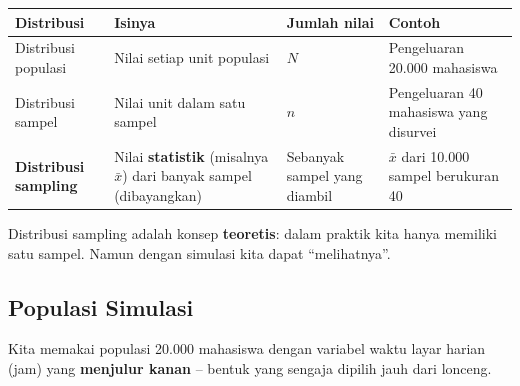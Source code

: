 \documentclass[
  indonesian,
  letterpaper,
]{book}
\newcounter{none} %
\begin{document}
{\def\LTcaptype{none} %
\begin{longtable}[]{@{}
  >{\raggedright\arraybackslash}p{}
  >{\raggedright\arraybackslash}p{}
  >{\raggedright\arraybackslash}p{}
  >{\raggedright\arraybackslash}p{}@{}}
\toprule\noalign{}
\begin{minipage}[b]{\linewidth}\raggedright
Distribusi
\end{minipage} & \begin{minipage}[b]{\linewidth}\raggedright
Isinya
\end{minipage} & \begin{minipage}[b]{\linewidth}\raggedright
Jumlah nilai
\end{minipage} & \begin{minipage}[b]{\linewidth}\raggedright
Contoh
\end{minipage} \\
\midrule\noalign{}
\endhead
\bottomrule\noalign{}
\endlastfoot
Distribusi populasi & Nilai setiap unit populasi & \(N\) & Pengeluaran
20.000 mahasiswa \\
Distribusi sampel & Nilai unit dalam satu sampel & \(n\) & Pengeluaran
40 mahasiswa yang disurvei \\
\textbf{Distribusi sampling} & Nilai \textbf{statistik} (misalnya
\(\bar{x}\)) dari banyak sampel (dibayangkan) & Sebanyak sampel yang
diambil & \(\bar{x}\) dari 10.000 sampel berukuran 40 \\
\end{longtable}
}

Distribusi sampling adalah konsep \textbf{teoretis}: dalam praktik kita
hanya memiliki satu sampel. Namun dengan simulasi kita dapat
``melihatnya''.

\subsection{Populasi Simulasi}\label{populasi-simulasi}

Kita memakai populasi 20.000 mahasiswa dengan variabel waktu layar
harian (jam) yang \textbf{menjulur kanan} -- bentuk yang sengaja dipilih
jauh dari lonceng.
\end{document}

